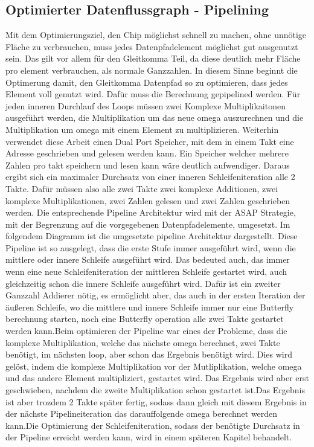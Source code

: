 \documentclass[fontsize=12pt,paper=a4,ngerman]{scrarticle}
\begin{document}
\subsection{Optimierter Datenflussgraph - Pipelining}
Mit dem Optimierungsziel, den Chip möglichst schnell zu machen, ohne unnötige
Fläche zu verbrauchen, muss jedes Datenpfadelement möglichst gut ausgenutzt
sein. Das gilt vor allem für den Gleitkomma Teil, da diese deutlich mehr Fläche
pro element verbrauchen, als normale Ganzzahlen. In diesem Sinne beginnt die
Optimerung damit, den Gleitkomma Datenpfad so zu optimieren, dass jedes Element
voll genutzt wird. Dafür muss die Berechnung gepipelined werden. Für jeden
inneren Durchlauf des Loops müssen zwei Komplexe Multiplikaitonen ausgeführt
werden, die Multiplikation um das neue omega auszurechnen und die
Multiplikation um omega mit einem Element zu multiplizieren. Weiterhin
verwendet diese Arbeit einen Dual Port Speicher, mit dem in einem Takt eine
Adresse geschrieben und gelesen werden kann. Ein Speicher welcher mehrere
Zahlen pro takt speichern und lesen kann wäre deutlich aufwendiger. Daraus
ergibt sich ein maximaler Durchsatz von einer inneren Schleifeniteration alle 2
Takte. Dafür müssen also alle zwei Takte zwei komplexe Additionen, zwei
komplexe Multiplikationen, zwei Zahlen gelesen und zwei Zahlen geschrieben
werden. Die entsprechende Pipeline Architektur wird mit der ASAP Strategie, mit
der Begrenzung auf die vorgegebenen Datenpfadelemente, umgesetzt. Im folgendem
Diagramm ist die umgesetzte pipeline Architektur dargestellt. Diese Pipeline
ist so ausgelegt, dass die erste Stufe immer ausgeführt wird, wenn die mittlere
oder innere Schleife ausgeführt wird. Das bedeuted auch, das immer wenn eine
neue Schleifeniteration der mittleren Schleife gestartet wird, auch
gleichzeitig schon die innere Schleife ausgeführt wird. Dafür ist ein zweiter
Ganzzahl Addierer nötig, es ermöglicht aber, das auch in der ersten Iteration
der äußeren Schleife, wo die mittlere und innere Schleife immer nur eine
Butterfly berechnung starten, noch eine Butterfly operation alle zwei Takte
gestartet werden kann.Beim optimieren der Pipeline war eines der Probleme, dass
die komplexe Multiplikation, welche das nächste omega berechnet, zwei Takte
benötigt, im nächsten loop, aber schon das Ergebnis benötigt wird. Dies wird
gelöst, indem die komplexe Multiplikation vor der Mutliplikation, welche omega
und das andere Element multipliziert, gestartet wird. Das Ergebnis wird aber
erst geschwieben, nachdem die zweite Multiplikation schon gestartet ist.Das
Ergebnis ist aber trozdem 2 Takte später fertig, sodass dann gleich mit diesem
Ergebnis in der nächste Pipelineiteration das darauffolgende omega berechnet
werden kann.Die Optimierung der Schleifeniteration, sodass der benötigte
Durchsatz in der Pipeline erreicht werden kann, wird in einem späteren Kapitel
behandelt. %
\end{document}
